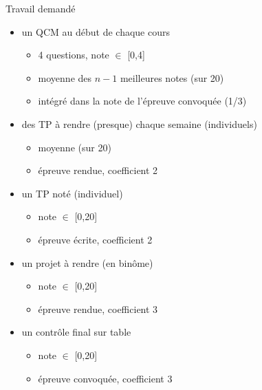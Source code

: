 \begin {frame} {Travail demandé}
    \begin {itemize}
	\item un QCM au début de chaque cours
	    \begin {itemize}
		\item 4 questions, note $\in$ [0,4]
		\item moyenne des $n-1$ meilleures notes (sur 20)
		\item intégré dans la note de l'épreuve convoquée (1/3)
	    \end {itemize}
	\item des TP à rendre (presque) chaque semaine (individuels)
	    \begin {itemize}
		\item moyenne (sur 20)
		\item épreuve rendue, coefficient 2
	    \end {itemize}
	\item un TP noté (individuel)
	    \begin {itemize}
		\item note $\in$ [0,20]
		\item épreuve écrite, coefficient 2
	    \end {itemize}
	\item un projet à rendre (en binôme)
	    \begin {itemize}
		\item note $\in$ [0,20]
		\item épreuve rendue, coefficient 3
	    \end {itemize}
	\item un contrôle final sur table
	    \begin {itemize}
		\item note $\in$ [0,20]
		\item épreuve convoquée, coefficient 3
	    \end {itemize}
    \end {itemize}
\end {frame}


